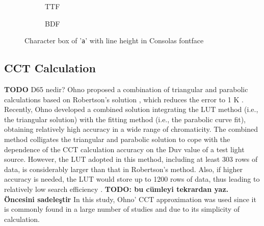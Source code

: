 \documentclass{article}
\begin{document}

\begin{figure}[htbp]
  \begin{subfigure}{0.48\textwidth}
    \centering
    

    \caption{TTF}
    \label{fig:charbox_TTF}
  \end{subfigure}
  \begin{subfigure}{0.48\textwidth}
    \centering

    \caption{BDF}
    \label{fig:charbox_BDF}
  \end{subfigure}

  \caption{Character box of '\texttt{a}' with line height in Consolas fontface}
  \label{fig:charbox}
\end{figure}

\subsection{CCT Calculation}

\textbf{TODO} D65 nedir?
Ohno proposed a combination of triangular and parabolic
calculations based on Robertson’s solution \cite{robertson1968computation}, which reduces the error to 1 K \cite{ohno2014practical}. Recently, Ohno developed a combined solution integrating the LUT method (i.e., the triangular solution) with the fitting method (i.e., the parabolic curve fit), obtaining relatively high accuracy in a wide range of chromaticity. The combined method colligates the triangular and parabolic solution to cope with the dependence of the CCT calculation accuracy on the Duv value of a test light source. However, the LUT adopted in this method, including at least 303 rows of data, is considerably larger than that in Robertson’s method. Also, if higher accuracy is needed, the LUT would store up to 1200 rows of data, thus leading to relatively low search efficiency \cite{zhang2019high}. \textbf{TODO: bu cümleyi tekrardan yaz. Öncesini sadeleştir} In this study, Ohno' CCT approximation was used since it is commonly found in a large number of studies and due to its simplicity of calculation.
\end{document}
